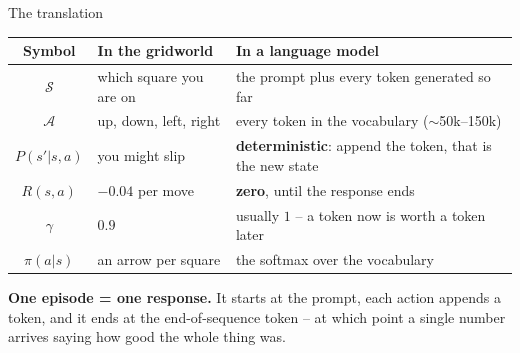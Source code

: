 \documentclass[aspectratio=169]{beamer}
\begin{document}
\begin{frame}{The translation}
  \begin{center}
  \small
  \begin{tabular}{c l l}
    \toprule
    \textbf{Symbol} & \textbf{In the gridworld} & \textbf{In a language model} \\
    \midrule
    $\mathcal{S}$ & which square you are on & the prompt plus every token generated so far \\
    $\mathcal{A}$ & up, down, left, right & every token in the vocabulary ($\sim$50k--150k) \\
    $P(s'|s,a)$ & you might slip & \textbf{deterministic}: append the token, that is the new state \\
    $R(s,a)$ & $-0.04$ per move & \textbf{zero}, until the response ends \\
    $\gamma$ & $0.9$ & usually $1$ -- a token now is worth a token later \\
    $\pi(a|s)$ & an arrow per square & the softmax over the vocabulary \\
    \bottomrule
  \end{tabular}
  \end{center}

  \vskip 10pt
  \begin{tcolorbox}[colback=paramgreen!8, colframe=paramgreen, boxrule=0.6pt, arc=2pt]
    \small
    \textbf{One episode = one response.} It starts at the prompt, each action appends a token,
    and it ends at the end-of-sequence token -- at which point a single number arrives saying
    how good the whole thing was.
  \end{tcolorbox}
\end{frame}
\end{document}
